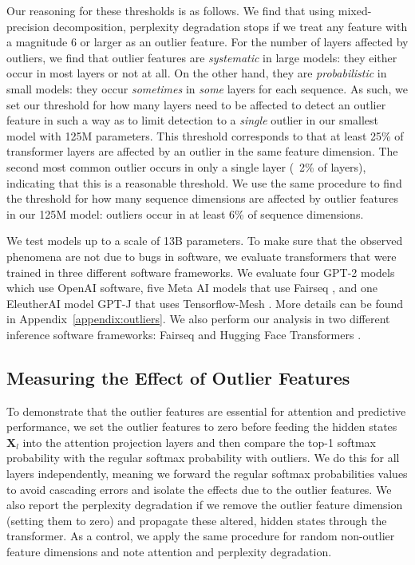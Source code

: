\documentclass{article}
\begin{document}
Our reasoning for these thresholds is as follows. We find that using mixed-precision decomposition, perplexity degradation stops if we treat any feature with a magnitude 6 or larger as an outlier feature. 
For the number of layers affected by outliers, we find that outlier features are {\it systematic} in large models: they either occur in most layers or not at all. On the other hand, they are {\it probabilistic} in small models: they occur {\it sometimes} in {\it some} layers for each sequence. 
As such, we set our threshold for how many layers need to be affected to detect an outlier feature in such a way as to limit detection to a {\it single} outlier in our smallest model with 125M parameters. This threshold corresponds to that at least 25\% of transformer layers are affected by an outlier in the same feature dimension. The second most common outlier occurs in only a single layer (~2\% of layers), indicating that this is a reasonable threshold.
We use the same procedure to find the threshold for how many sequence dimensions are affected by outlier features in our 125M model: outliers occur in at least 6\% of sequence dimensions.

We test models up to a scale of 13B parameters. To make sure that the observed phenomena are not due to bugs in software, we evaluate transformers that were trained in three different software frameworks. We evaluate four GPT-2 models which use OpenAI software, five Meta AI models that use Fairseq \citep{ott2019fairseq}, and one EleutherAI model GPT-J that uses Tensorflow-Mesh \citep{shazeer2018mesh}. More details can be found in Appendix~\ref{appendix:outliers}. We also perform our analysis in two different inference software frameworks: Fairseq and Hugging Face Transformers \citep{wolf2019huggingface}. 

\subsection{Measuring the Effect of Outlier Features}

To demonstrate that the outlier features are essential for attention and predictive performance, we set the outlier features to zero before feeding the hidden states $\mathbf{X}_l$ into the attention projection layers and then compare the top-1 softmax probability with the regular softmax probability with outliers. We do this for all layers independently, meaning we forward the regular softmax probabilities values to avoid cascading errors and isolate the effects due to the outlier features.
We also report the perplexity degradation if we remove the outlier feature dimension (setting them to zero) and propagate these altered, hidden states through the transformer. As a control, we apply the same procedure for random non-outlier feature dimensions and note attention and perplexity degradation.
\end{document}
